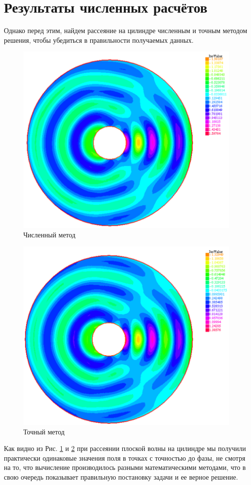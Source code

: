 \section{Результаты численных расчётов}
Однако перед этим, найдем рассеяние на цилиндре численным и точным методом решения, чтобы убедиться в правильности получаемых данных.
\begin{figure}[h!]
	\centering
	\includegraphics[width=0.8\linewidth]{sc1.png}
	\caption{Численный метод}
	\label{fig:sc1}
\end{figure} 
\newpage
\begin{figure}[h!]
	\centering
	\includegraphics[width=0.8\linewidth]{sc2.png}
	\caption{Точный метод}
	\label{fig:sc2}
\end{figure}
Как видно из Рис. \ref{fig:sc1} и \ref{fig:sc2} при рассеянии плоской волны на цилиндре мы получили практически одинаковые значения поля в точках с точностью до фазы, не смотря на то, что вычисление производилось разными математическими методами, что в свою очередь показывает правильную постановку задачи и ее верное решение. \\ 
